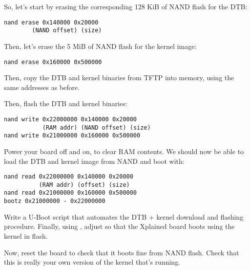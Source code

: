 So, let's start by erasing the corresponding 128 KiB of NAND flash
for the DTB:

\begin{verbatim}
nand erase 0x140000 0x20000
        (NAND offset) (size)
\end{verbatim}

Then, let's erase the 5 MiB of NAND flash for the kernel image:

\begin{verbatim}
nand erase 0x160000 0x500000
\end{verbatim}

Then, copy the DTB and kernel binaries from TFTP into memory, using the
same addresses as before.

Then, flash the DTB and kernel binaries:

\begin{verbatim}
nand write 0x22000000 0x140000 0x20000
           (RAM addr) (NAND offset) (size)
nand write 0x21000000 0x160000 0x500000
\end{verbatim}

Power your board off and on, to clear RAM contents. We should now be
able to load the DTB and kernel image from NAND and boot with:

\begin{verbatim}
nand read 0x22000000 0x140000 0x20000
          (RAM addr) (offset) (size)
nand read 0x21000000 0x160000 0x500000
bootz 0x21000000 - 0x22000000
\end{verbatim}

Write a U-Boot script that automates the DTB + kernel download
and flashing procedure. Finally, using , 
adjust  so that the Xplained board boots
using the kernel in flash.

Now, reset the board to check that it boots
fine from NAND flash. Check that this is really your own version of
the kernel that's running.
